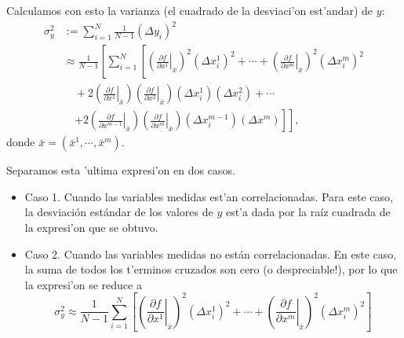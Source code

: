 Calculamos con esto la varianza (el cuadrado de la desviaci'on est'andar) de $y$:
\begin{align}
\sigma_y^2 &:= \sum_{i=1}^N\frac{1}{N-1}(\Delta y_i)^2 \\
&\approx \frac{1}{N-1}\left[\sum_{i=1}^N\left[\left(\left.\frac{\partial f}{\partial x^1}\right|_{\bar{x}}\right)^2 (\Delta x^1_i)^2 +\cdots + \left(\left.\frac{\partial f}{\partial x^m}\right|_{\bar{x}}\right)^2(\Delta x^m_i)^2 \right.\right. \nonumber \\
& \quad +  2\left(\left.\frac{\partial f}{\partial x^1}\right|_{\bar{x}}\right)\left(\left.\frac{\partial f}{\partial x^2}\right|_{\bar{x}}\right)(\Delta x^1_i)(\Delta x^2_i)+\cdots \nonumber\\
& \quad \left.\left.  +2\left(\left.\frac{\partial f}{\partial x^{m-1}}\right|_{\bar{x}}\right) \left(\left.\frac{\partial f}{\partial x^m}\right|_{\bar{x}}\right)(\Delta x^{m-1}_i)(\Delta x^m)\right]\right],
\end{align}
donde $\bar{x}=(\bar{x}^1,\cdots, \bar{x}^m)$.

Separamos esta 'ultima expresi'on en dos casos. 

\begin{itemize}
\item Caso 1. Cuando las variables medidas est'an correlacionadas.
Para este caso, la desviación estándar de los valores de $y$ est'a dada por la raíz cuadrada de la expresi'on que se obtuvo.

\item Caso 2. Cuando las variables medidas no están correlacionadas.
En este caso, la suma de todos los t'erminos cruzados son cero (o despreciable!), por lo que la expresi'on se reduce a
\begin{equation}
\sigma_y^2 \approx \frac{1}{N-1}\sum_{i=1}^N\left[\left(\left.\frac{\partial f}{\partial x^1}\right|_{\bar{x}}\right)^2 (\Delta x^1_i)^2 +\cdots + \left(\left.\frac{\partial f}{\partial x^m}\right|_{\bar{x}}\right)^2(\Delta x^m_i)^2\right]
\end{equation}
\end{itemize}

